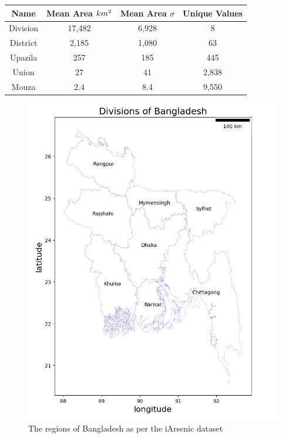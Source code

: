 \begin{center}
    \begin{tabular}{|c c c c|} 
         \hline
         Name & Mean Area $km\textsuperscript{2}$ & Mean Area $\sigma$ & Unique Values \\ [0.5ex] 
         \hline\hline
         Division & 17,482 & 6,928 & 8 \\ 
         \hline
         District & 2,185 & 1,080 & 63 \\
         \hline
         Upazila & 257 & 185 & 445 \\
         \hline
         Union & 27 & 41 & 2,838 \\
         \hline
         Mouza & 2.4 & 8.4 & 9,550 \\ [1ex] 
         \hline
    \end{tabular}
\end{center}

\begin{figure}
    \centering
    \includegraphics[scale=0.6]{figures/labelled_divisions.png} 
    \caption{The regions of Bangladesh as per the iArsenic dataset}
    \label{fig:x labelled_divisions}
\end{figure}

